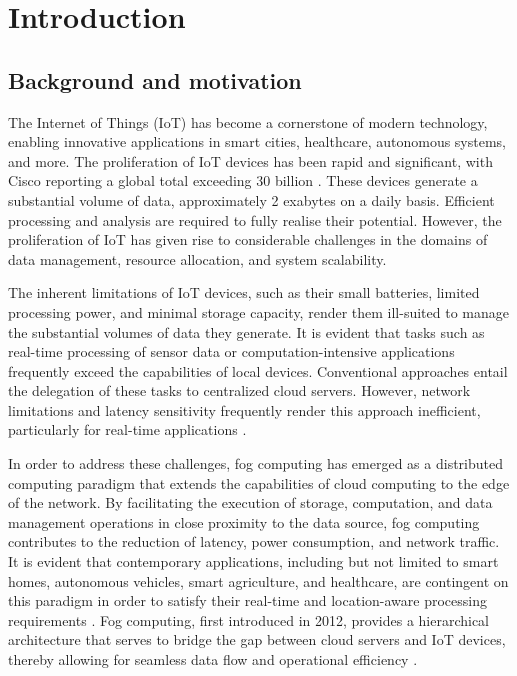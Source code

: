 \documentclass[preprint,12pt]{elsarticle}
\begin{document}



\section{Introduction}
\subsection{Background and motivation}

The Internet of Things (IoT) has become a cornerstone of modern technology, enabling innovative applications in smart cities, healthcare, autonomous systems, and more. The proliferation of IoT devices has been rapid and significant, with Cisco reporting a global total exceeding 30 billion \cite{benaboura_comprehensive_nodate}. These devices generate a substantial volume of data, approximately 2 exabytes on a daily basis. Efficient processing and analysis are required to fully realise their potential. However, the proliferation of IoT has given rise to considerable challenges in the domains of data management, resource allocation, and system scalability.


The inherent limitations of IoT devices, such as their small batteries, limited processing power, and minimal storage capacity, render them ill-suited to manage the substantial volumes of data they generate. It is evident that tasks such as real-time processing of sensor data or computation-intensive applications frequently exceed the capabilities of local devices. Conventional approaches entail the delegation of these tasks to centralized cloud servers. However, network limitations and latency sensitivity frequently render this approach inefficient, particularly for real-time applications \cite{benaboura_comprehensive_nodate}.

In order to address these challenges, fog computing has emerged as a distributed computing paradigm that extends the capabilities of cloud computing to the edge of the network. By facilitating the execution of storage, computation, and data management operations in close proximity to the data source, fog computing contributes to the reduction of latency, power consumption, and network traffic. It is evident that contemporary applications, including but not limited to smart homes, autonomous vehicles, smart agriculture, and healthcare, are contingent on this paradigm in order to satisfy their real-time and location-aware processing requirements \cite{das_review_2023}. Fog computing, first introduced in 2012, provides a hierarchical architecture that serves to bridge the gap between cloud servers and IoT devices, thereby allowing for seamless data flow and operational efficiency \cite{fahimullah_review_2022}.
\end{document}
